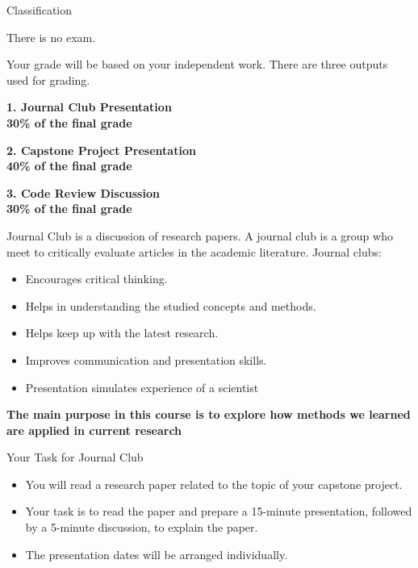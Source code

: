 \begin{frame}{Classification}
\begin{center}
    \Large
    There is no exam.
    
    \vspace{1em}
    Your grade will be based on your independent work. There are three outputs used for grading.

    \vspace{1em}
    \color{primary}
    \textbf{1. Journal Club Presentation\\\small30\% of the final grade }
    
    \vspace{1em}
    \color{primary}
    \textbf{2. Capstone Project Presentation\\\small40\% of the final grade} 

    \vspace{1em}
    \color{primary}
    \textbf{3. Code Review Discussion\\\small30\% of the final grade}
    
    
\end{center}
\end{frame}

\begin{frame}{Journal Club is a discussion of research papers.}
   A journal club is a group who meet to critically evaluate  articles in the academic literature. Journal clubs:
     \begin{itemize}
        \item Encourages critical thinking.
        \item Helps in understanding the studied concepts and methods.
        \item Helps keep up with the latest research.
        \item Improves communication and presentation skills.
        \item Presentation simulates experience of a scientist
    \end{itemize}
\vspace{1em}
\textbf{The main purpose in this course is to explore how methods we learned are applied in current research}
    
\end{frame}

\begin{frame}{Your Task for Journal Club}
    \begin{itemize}
        \item You will read a research paper related to the topic of your capstone project.
        \item Your task is to read the paper and prepare a 15-minute presentation, followed by a 5-minute discussion, to explain the paper.
       \item The presentation dates will be arranged individually. 
    \end{itemize}
\end{frame}

